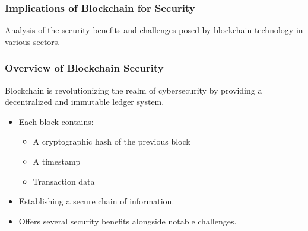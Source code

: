 \documentclass{beamer}
\begin{document}
\begin{frame}[fragile]
    \frametitle{Implications of Blockchain for Security}
    Analysis of the security benefits and challenges posed by blockchain technology in various sectors.
\end{frame}

\begin{frame}[fragile]
    \frametitle{Overview of Blockchain Security}
    Blockchain is revolutionizing the realm of cybersecurity by providing a decentralized and immutable ledger system. 
    \begin{itemize}
        \item Each block contains:
        \begin{itemize}
            \item A cryptographic hash of the previous block
            \item A timestamp
            \item Transaction data
        \end{itemize}
        \item Establishing a secure chain of information.
        \item Offers several security benefits alongside notable challenges.
    \end{itemize}
\end{frame}
\end{document}
